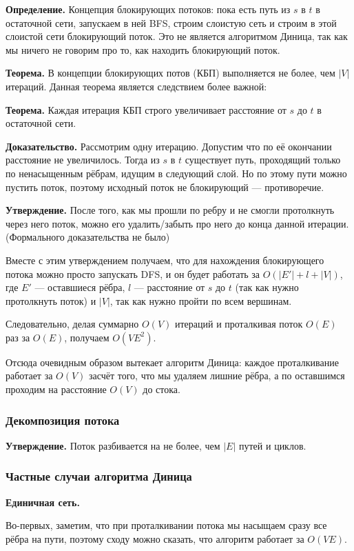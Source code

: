 \textbf{Определение.} Концепция блокирующих потоков: пока есть путь из $s$ в $t$ в остаточной сети, запускаем в ней BFS, строим слоистую сеть и строим в этой слоистой сети блокирующий поток.
Это не является алгоритмом Диница, так как мы ничего не говорим про то, как находить блокирующий поток.

\textbf{Теорема.} В концепции блокирующих потов (КБП) выполняется не более, чем $|V|$ итераций.
Данная теорема является следствием более важной:

\textbf{Теорема.} Каждая итерация КБП строго увеличивает расстояние от $s$ до $t$ в остаточной сети.

\textbf{Доказательство.} Рассмотрим одну итерацию. Допустим что по её окончании расстояние не увеличилось.
Тогда из $s$ в $t$ существует путь, проходящий только по ненасыщенным рёбрам, идущим в следующий слой.
Но по этому пути можно пустить поток, поэтому исходный поток не блокирующий --- противоречие.

\textbf{Утверждение.} После того, как мы прошли по ребру и не смогли протолкнуть через него поток, можно его удалить/забыть про него до конца данной итерации.
(Формального доказательства не было)

Вместе с этим утверждением получаем, что для нахождения блокирующего потока можно просто запускать DFS, и он будет работать за $O(|E'| + l + |V|)$, где $E'$ --- оставшиеся рёбра, $l$ --- расстояние от $s$ до $t$ (так как нужно протолкнуть поток) и $|V|$, так как нужно пройти по всем вершинам.

Следовательно, делая суммарно $O(V)$ итераций и проталкивая поток $O(E)$ раз за $O(E)$, получаем $O(VE^2)$.

Отсюда очевидным образом вытекает алгоритм Диница: каждое проталкивание работает за $O(V)$ засчёт того, что мы удаляем лишние рёбра, а по оставшимся проходим на расстояние $O(V)$ до стока.

\subsubsection{Декомпозиция потока}
\textbf{Утверждение.} Поток разбивается на не более, чем $|E|$ путей и циклов.

\subsubsection{Частные случаи алгоритма Диница}
\textbf{Единичная сеть.}

Во-первых, заметим, что при проталкивании потока мы насыщаем сразу все рёбра на пути, поэтому сходу можно сказать, что алгоритм работает за $O(VE)$.

